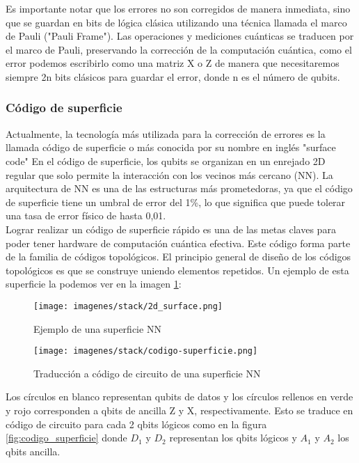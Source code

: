 Es importante notar que los errores no son corregidos de manera inmediata, sino que se guardan en bits de lógica clásica utilizando una técnica llamada el marco de Pauli ("Pauli Frame"). Las operaciones y mediciones cuánticas se traducen por el marco de Pauli, preservando la corrección de la computación cuántica, como el error podemos escribirlo como una matriz X o Z de manera que necesitaremos siempre 2n bits clásicos para guardar el error, donde n es el número de qubits.\\

\subsubsection{Código de superficie}

Actualmente, la tecnología más utilizada para la corrección de errores es la llamada código de superficie o más conocida por su nombre en inglés "surface code" En el código de superficie, los qubits se organizan en un enrejado 2D regular que solo permite la interacción con los vecinos más cercano (NN). La arquitectura de NN es una de las estructuras más prometedoras, ya que el código de superficie tiene un umbral de error del 1\%, lo que significa que puede tolerar una tasa de error físico de hasta 0,01.\\

Lograr realizar un código de superficie rápido es una de las metas claves para poder tener hardware de computación cuántica efectiva. Este código forma parte de la familia de códigos topológicos. El principio general de diseño
de los códigos topológicos es que se construye uniendo elementos repetidos. Un ejemplo de esta superficie la podemos ver en la imagen \ref{fig:superficie_2d}:\\

\begin{figure}[hbtp]
    \centering
    \texttt{[image: imagenes/stack/2d\_surface.png]}
    \caption{Ejemplo de una superficie NN}
    \label{fig:superficie_2d}
\end{figure}


\begin{figure}[hbtp]
    \centering
    \texttt{[image: imagenes/stack/codigo-superficie.png]}
    \caption{Traducción a código de circuito de una superficie NN}
    \label{fig:codigo-superficie}
\end{figure}

Los círculos en blanco representan qubits de datos y los círculos rellenos en verde y rojo corresponden a qbits de ancilla Z y X, respectivamente. Esto se traduce en código de circuito para cada 2 qbits lógicos como en la figura \ref{fig:codigo_superficie} donde $D_{1}$ y $D_{2}$ representan los qbits lógicos y $A_{1}$ y $A_{2}$ los qbits ancilla.

